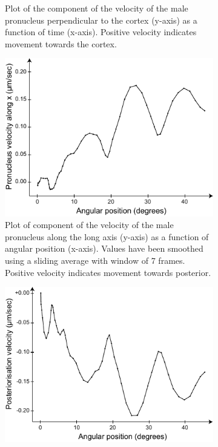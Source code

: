 \begin{figure}[p]
\begin{subfigure}[t]{0.45\textwidth}
    \caption{Plot of the component of the velocity of the male pronucleus perpendicular to the cortex (y-axis) as a function of time (x-axis). Positive velocity indicates movement towards the cortex.} 
    \label{subfig:malePronucleusTrackingVelocities-perpVelVsTime}
\end{subfigure}

\begin{subfigure}[t]{0.45\textwidth}
    \centering
    \includegraphics[width=\textwidth]{ExpMethods/FigTrackNucleus/vxVsAngleSmooth.pdf}
    \caption{Plot of component of the velocity of the male pronucleus along the long axis (y-axis) as a function of angular position (x-axis). Values have been smoothed using a sliding average with window of \num{7} frames. Positive velocity indicates movement towards posterior.} 
    \label{subfig:malePronucleusTrackingVelocities-vxVsAngleSmooth}
\end{subfigure}
\hfill
\begin{subfigure}[t]{0.45\textwidth}
    \centering
    \includegraphics[width=\textwidth]{ExpMethods/FigTrackNucleus/postVelVsAngleSmooth.pdf}

\end{subfigure}
\end{figure}
